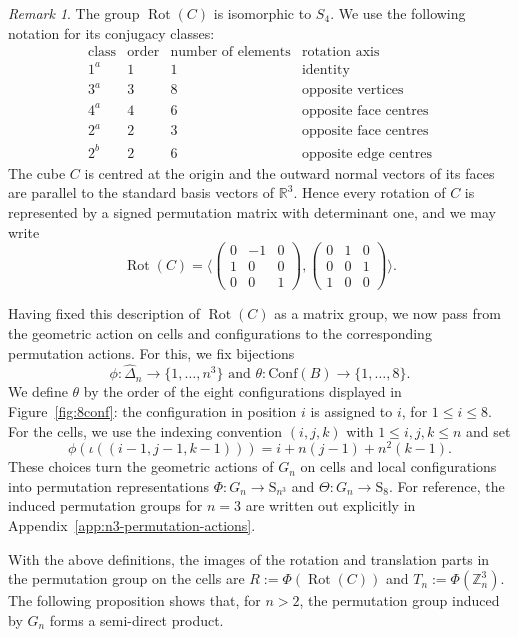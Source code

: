 \documentclass[12pt]{article}
\theoremstyle{definition}
\theoremstyle{remark}
\newtheorem{remark}[theorem]{Remark}
\DeclareMathOperator{\Rot}{Rot}
\begin{document}
\begin{remark}\label{rem:mat}
The group $\Rot(C)$ is isomorphic to $S_4$. We use the following notation for its conjugacy classes:
\[
\begin{array}{c|c|c|c}
\text{class} & \text{order} & \text{number of elements} & \text{rotation axis}\\
\hline
1^a & 1 & 1 & \text{identity}\\
3^a & 3 & 8 & \text{opposite vertices}\\
4^a & 4 & 6 & \text{opposite face centres}\\
2^a & 2 & 3 & \text{opposite face centres}\\
2^b & 2 & 6 & \text{opposite edge centres}
\end{array}
\]
The cube $C$ is centred at the origin and the outward normal vectors of its faces are parallel to the standard basis vectors of $\mathbb{R}^3$. Hence every rotation of $C$ is represented by a signed permutation matrix with determinant one, and we may write
\[
\Rot(C)=\langle
\begin{pmatrix}
0&-1&0\\
1&0&0\\
0&0&1
\end{pmatrix}
,
\begin{pmatrix}
0&1&0\\
0&0&1\\
1&0&0
\end{pmatrix}
\rangle.
\]
\end{remark}
Having fixed this description of $\Rot(C)$ as a matrix group, we now pass from the geometric action on cells and configurations to the corresponding permutation actions. For this, we fix bijections
    \[
     \phi:\widehat{\Delta}_n \to \{1,\ldots,n^3\} \text{ and } \theta:\mathrm{Conf}(B)\to \{1,\ldots,8 \}.
    \]
We define $\theta$ by the order of the eight configurations displayed in Figure~\ref{fig:8conf}: the configuration in position $i$ is assigned to $i$, for $1\leq i\leq 8$. For the cells, we use the indexing convention $(i,j,k)$ with $1\leq i,j,k\leq n$ and set
\[
\phi(\iota((i-1,j-1,k-1)))=i+n(j-1)+n^2(k-1).
\]
These choices turn the geometric actions of $G_n$ on cells and local configurations into permutation representations $\Phi:G_n\to \mathrm{S}_{n^3}$ and $\Theta:G_n\to \mathrm{S}_8.
$
For reference, the induced permutation groups for $n=3$ are written out explicitly in Appendix~\ref{app:n3-permutation-actions}.

With the above definitions, the images of the rotation and translation parts in the permutation group on the cells are
$R:=\Phi(\Rot(C))$ and $T_n:=\Phi(\mathbb{Z}_n^3)$.
The following proposition shows that, for $n>2$, the permutation group induced by $G_n$ forms a semi-direct product.
\end{document}
